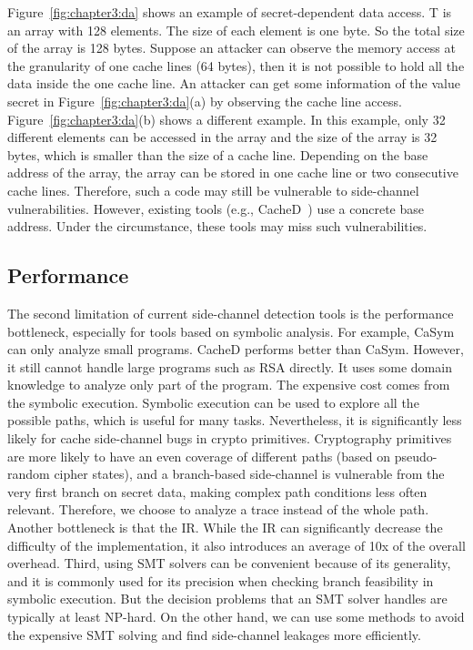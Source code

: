 Figure~\ref{fig:chapter3:da} shows an example of secret-dependent data access. \textsf{T} is an array with 128 elements. The size of each element is one byte. So the total size of the array is 128 bytes. Suppose an attacker can observe the memory access at the granularity of one cache lines (64 bytes), then it is not possible to hold all the data inside the one cache line. An attacker can get some information of the value \textsf{secret} in Figure~\ref{fig:chapter3:da}(a) by observing the cache line access. Figure~\ref{fig:chapter3:da}(b) shows a different example. In this example, only 32 different elements can be accessed in the array and the size of the array is 32 bytes, which is smaller than the size of a cache line. Depending on the base address of the array, the array can be stored in one cache line or two consecutive cache lines. Therefore, such a code may still be vulnerable to side-channel vulnerabilities. However, existing tools (e.g., CacheD~\cite{203878}) use a concrete base address. Under the circumstance, these tools may miss such vulnerabilities.

\subsection{Performance}
The second limitation of current side-channel detection tools is the performance bottleneck, especially for tools based on symbolic analysis. For example, CaSym~\cite{Brotzman19Casym} can only analyze small programs. CacheD performs better than CaSym. However, it still cannot handle large programs such as RSA directly. It uses some domain knowledge to analyze only part of the program. The expensive cost comes from the symbolic execution. Symbolic execution can be used to explore all the possible paths, which is useful for many tasks.
Nevertheless, it is significantly less likely for cache side-channel bugs in crypto primitives. Cryptography primitives are more likely to have an even coverage of different paths (based on pseudo-random cipher states), and a branch-based side-channel is vulnerable from the very first branch on secret data, making complex path conditions less often relevant. Therefore, we choose to analyze a trace instead of the whole path. Another bottleneck is that the IR. While the IR can significantly decrease the difficulty of the implementation, it also introduces an average of 10x of the overall overhead. Third, using SMT solvers can be convenient because of its generality, and it is commonly used for its precision when checking branch feasibility in symbolic execution. But the decision problems that an SMT solver handles are typically at least NP-hard. On the other hand, we can use some methods to avoid the expensive SMT solving and find side-channel leakages more efficiently.

